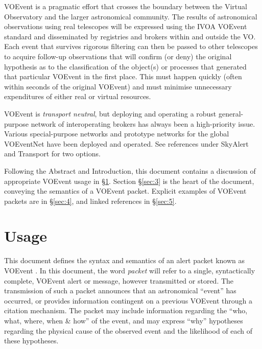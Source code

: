 \documentclass[11pt,a4paper]{ivoa}
\begin{document}
VOEvent is a pragmatic effort that crosses the boundary between the Virtual 
Observatory and the larger astronomical community. The results of astronomical 
observations using real telescopes will be expressed using the IVOA VOEvent 
standard and disseminated by registries and brokers within and outside the VO. 
Each event that survives rigorous filtering can then be passed to other 
telescopes to acquire follow-up observations that will confirm (or deny) the 
original hypothesis as to the classification of the object(s) or processes that 
generated that particular VOEvent in the first place. This must happen quickly 
(often within seconds of the original VOEvent) and must minimise unnecessary 
expenditures of either real or virtual resources. 

VOEvent is \emph{transport neutral}, but deploying and operating a robust 
general-purpose network of interoperating brokers has always been a 
high-priority issue. Various special-purpose networks and prototype networks 
for the global VOEventNet have been deployed and operated. See references under
SkyAlert \citep{bib05} and Transport \citep{bib33} for two options. 

Following the Abstract and Introduction, this document contains a discussion of
appropriate VOEvent usage in \S\ref{sec:2}. Section \S\ref{sec:3} is the heart
of the document, conveying the semantics of a VOEvent packet. Explicit examples
of VOEvent packets are in \S\ref{sec:4}, and linked references in \S\ref{sec:5}. 

\section{Usage}
\label{sec:2}
This document defines the syntax and semantics of an alert packet known as 
VOEvent \citep{2011ivoa.spec.0711S}. In this document, the word \emph{packet} 
will refer to a single, syntactically complete, VOEvent alert or message, 
however transmitted or stored. The transmission of such a packet announces that
an astronomical ``event'' has occurred, or provides information contingent on a 
previous VOEvent through a citation mechanism. The packet may include 
information regarding the ``who, what, where, when \& how'' of the event, and 
may express ``why'' hypotheses regarding the physical cause of the observed 
event and the likelihood of each of these hypotheses. 
\end{document}
